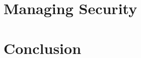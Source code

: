 \documentclass{sig-alternate}
\begin{document}

\section{Managing Security}
\label{sec:mgmt}

\section{Conclusion}
\label{sec:conclusion}



\end{document}
